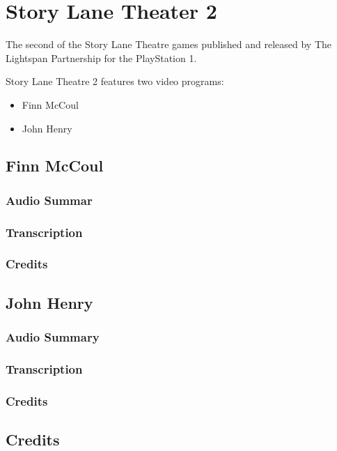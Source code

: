 \chapter{Story Lane Theater 2}


The second of the Story Lane Theatre games published and released by The Lightspan Partnership for the PlayStation 1.

Story Lane Theatre 2 features two video programs:

\begin{itemize}
    \item Finn McCoul
    \item John Henry
\end{itemize}

\clearpage
\newpage

\section{Finn McCoul}

\subsection{Audio Summar}

\subsection{Transcription}

\subsection{Credits}

\section{John Henry}

\subsection{Audio Summary}

\subsection{Transcription}

\subsection{Credits}

\section{Credits}